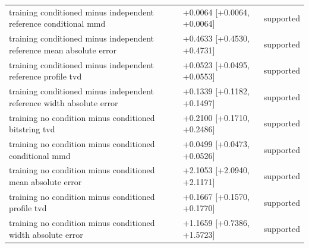 \begin{table}[p]
\begin{tabular}{@{}p{}p{}p{}@{}}
training conditioned minus independent reference conditional mmd & +0.0064 [+0.0064, +0.0064] & supported \\
training conditioned minus independent reference mean absolute error & +0.4633 [+0.4530, +0.4731] & supported \\
training conditioned minus independent reference profile tvd & +0.0523 [+0.0495, +0.0553] & supported \\
training conditioned minus independent reference width absolute error & +0.1339 [+0.1182, +0.1497] & supported \\
training no condition minus conditioned bitstring tvd & +0.2100 [+0.1710, +0.2486] & supported \\
training no condition minus conditioned conditional mmd & +0.0499 [+0.0473, +0.0526] & supported \\
training no condition minus conditioned mean absolute error & +2.1053 [+2.0940, +2.1171] & supported \\
training no condition minus conditioned profile tvd & +0.1667 [+0.1570, +0.1770] & supported \\
training no condition minus conditioned width absolute error & +1.1659 [+0.7386, +1.5723] & supported \\
\bottomrule
\end{tabular}
\end{table}
\clearpage
